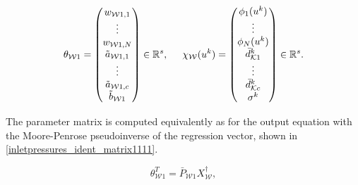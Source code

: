   \begin{equation}
\label{par_regr_matrix1}
\theta_{\mathcal{W}1} = 
          \begin{pmatrix}
           w_{\mathcal{W}1,1}  \\
           \vdots  \\
           w_{\mathcal{W}1,N}  \\
           \tilde{a}_{\mathcal{W}1,1} \\
           \vdots \\
           \tilde{a}_{\mathcal{W}1,c} \\
           \tilde{b}_{\mathcal{W}1} \\
         \end{pmatrix}
         \in  \mathbb{R}^{s},
         \hspace{5mm}
         \chi_{\mathcal{W}}(u^k) = 
         \begin{pmatrix}
           \phi_{1}(u^k)  \\
           \vdots  \\
           \phi_{N}(u^k)  \\
           \bar{d}_{\mathcal{K}1}^k \\
           \vdots  \\
           \bar{d}_{\mathcal{K}c}^k \\[1pt]
           \sigma^k \\
         \end{pmatrix}
         \in  \mathbb{R}^{s}.
\end{equation}

The parameter matrix is computed equivalently as for the output equation with the Moore-Penrose pseudoinverse of the regression vector, shown in \eqref{inletpressures_ident_matrix1111}.

\begin{equation}
\label{inletpressures_ident_matrix1111}
 \theta^T_{\mathcal{W}1} = \bar{P}_{\mathcal{W}1} X_{\mathcal{W}}^{\dagger}, 
\end{equation}



